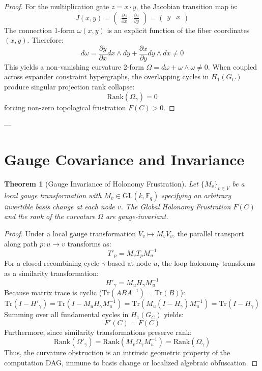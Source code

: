 \documentclass[11pt,a4paper]{article}
\newtheorem{theorem}{Theorem}[section]
\newcommand{\F}{\mathbb{F}}
\newcommand{\Tr}{\mathrm{Tr}}
\newcommand{\Rank}{\mathrm{Rank}}
\newcommand{\GL}{\mathrm{GL}}
\begin{document}
\begin{proof}
For the multiplication gate $z = x \cdot y$, the Jacobian transition map is:
\[
J(x, y) = \begin{pmatrix} \frac{\partial z}{\partial x} & \frac{\partial z}{\partial y} \end{pmatrix} = \begin{pmatrix} y & x \end{pmatrix}
\]
The connection 1-form $\omega(x, y)$ is an explicit function of the fiber coordinates $(x, y)$. Therefore:
\[
d\omega = \frac{\partial y}{\partial x} dx \wedge dy + \frac{\partial x}{\partial y} dy \wedge dx \neq 0
\]
This yields a non-vanishing curvature 2-form $\Omega = d\omega + \omega \wedge \omega \neq 0$. When coupled across expander constraint hypergraphs, the overlapping cycles in $H_1(G_C)$ produce singular projection rank collapse:
\[
\Rank(\Omega_\gamma) = 0
\]
forcing non-zero topological frustration $F(C) > 0$.
\end{proof}

---

\section{Gauge Covariance and Invariance}

\begin{theorem}[Gauge Invariance of Holonomy Frustration]\label{thm:gauge_invariance}
Let $\{M_v\}_{v \in V}$ be a local gauge transformation with $M_v \in \GL(k, \F_q)$ specifying an arbitrary invertible basis change at each node $v$. The Global Holonomy Frustration $F(C)$ and the rank of the curvature $\Omega$ are gauge-invariant.
\end{theorem}

\begin{proof}
Under a local gauge transformation $V_v \mapsto M_v V_v$, the parallel transport along path $p: u \to v$ transforms as:
\[
T'_p = M_v T_p M_u^{-1}
\]
For a closed recombining cycle $\gamma$ based at node $u$, the loop holonomy transforms as a similarity transformation:
\[
H'_\gamma = M_u H_\gamma M_u^{-1}
\]
Because matrix trace is cyclic ($\Tr(A B A^{-1}) = \Tr(B)$):
\[
\Tr(I - H'_\gamma) = \Tr(I - M_u H_\gamma M_u^{-1}) = \Tr(M_u (I - H_\gamma) M_u^{-1}) = \Tr(I - H_\gamma)
\]
Summing over all fundamental cycles in $H_1(G_C)$ yields:
\[
F'(C) = F(C)
\]
Furthermore, since similarity transformations preserve rank:
\[
\Rank(\Omega'_\gamma) = \Rank(M_v \Omega_\gamma M_u^{-1}) = \Rank(\Omega_\gamma)
\]
Thus, the curvature obstruction is an intrinsic geometric property of the computation DAG, immune to basis change or localized algebraic obfuscation.
\end{proof}
\end{document}
